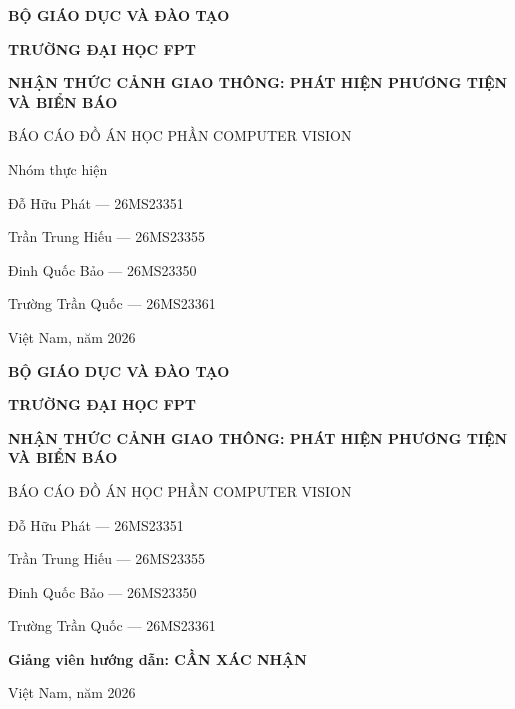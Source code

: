 \begin{titlepage}
\begin{center}
{\bfseries BỘ GIÁO DỤC VÀ ĐÀO TẠO\par}
{\bfseries TRƯỜNG ĐẠI HỌC FPT\par}
\vspace{3cm}
{\Large\bfseries NHẬN THỨC CẢNH GIAO THÔNG: PHÁT HIỆN PHƯƠNG TIỆN VÀ BIỂN BÁO\par}
\vspace{1cm}
{\large BÁO CÁO ĐỒ ÁN HỌC PHẦN COMPUTER VISION\par}
\vspace{1.8cm}
{\normalsize Nhóm thực hiện\par}
Đỗ Hữu Phát — 26MS23351\par
Trần Trung Hiếu — 26MS23355\par
Đinh Quốc Bảo — 26MS23350\par
Trường Trần Quốc — 26MS23361\par
\vfill
{\normalsize Việt Nam, năm 2026\par}
\end{center}
\end{titlepage}

\begin{titlepage}
\begin{center}
{\bfseries BỘ GIÁO DỤC VÀ ĐÀO TẠO\par}
{\bfseries TRƯỜNG ĐẠI HỌC FPT\par}
\vspace{3cm}
{\Large\bfseries NHẬN THỨC CẢNH GIAO THÔNG: PHÁT HIỆN PHƯƠNG TIỆN VÀ BIỂN BÁO\par}
\vspace{0.8cm}
{\large BÁO CÁO ĐỒ ÁN HỌC PHẦN COMPUTER VISION\par}
\vspace{1.4cm}
Đỗ Hữu Phát — 26MS23351\par
Trần Trung Hiếu — 26MS23355\par
Đinh Quốc Bảo — 26MS23350\par
Trường Trần Quốc — 26MS23361\par
\vspace{1.4cm}
{\bfseries Giảng viên hướng dẫn: CẦN XÁC NHẬN\par}
\vfill
{\normalsize Việt Nam, năm 2026\par}
\end{center}
\end{titlepage}
